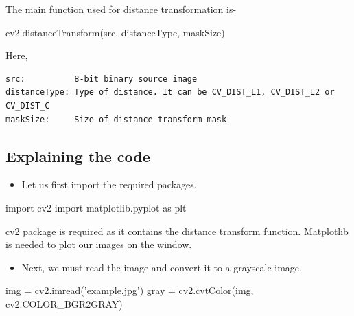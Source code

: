 \documentclass[]{article}
\newenvironment{Shaded}{}{}
\newcommand{\StringTok}[1]{\textcolor[rgb]{0.25,0.44,0.63}{{#1}}}
\newcommand{\ImportTok}[1]{{#1}}
\newcommand{\OperatorTok}[1]{\textcolor[rgb]{0.40,0.40,0.40}{{#1}}}
\newcommand{\NormalTok}[1]{{#1}}
\providecommand{\tightlist}{%
  \setlength{\itemsep}{0pt}\setlength{\parskip}{0pt}}
\begin{document}
The main function used for distance transformation is-

\begin{Shaded}
\begin{Highlighting}[]
\NormalTok{cv2.distanceTransform(src, distanceType, maskSize)}
\end{Highlighting}
\end{Shaded}

Here,

\begin{verbatim}
src:          8-bit binary source image
distanceType: Type of distance. It can be CV_DIST_L1, CV_DIST_L2 or CV_DIST_C
maskSize:     Size of distance transform mask
\end{verbatim}

\subsection{Explaining the code}\label{explaining-the-code}

\begin{itemize}
\tightlist
\item
  Let us first import the required packages.
\end{itemize}

\begin{Shaded}
\begin{Highlighting}[]
    \ImportTok{import} \NormalTok{cv2}
    \ImportTok{import} \NormalTok{matplotlib.pyplot }\ImportTok{as} \NormalTok{plt}
\end{Highlighting}
\end{Shaded}

cv2 package is required as it contains the distance transform function.
Matplotlib is needed to plot our images on the window.

\begin{itemize}
\tightlist
\item
  Next, we must read the image and convert it to a grayscale image.
\end{itemize}

\begin{Shaded}
\begin{Highlighting}[]
    \NormalTok{img }\OperatorTok{=} \NormalTok{cv2.imread(}\StringTok{'example.jpg'}\NormalTok{)}
    \NormalTok{gray }\OperatorTok{=} \NormalTok{cv2.cvtColor(img, cv2.COLOR_BGR2GRAY)}
\end{Highlighting}
\end{Shaded}
\end{document}
